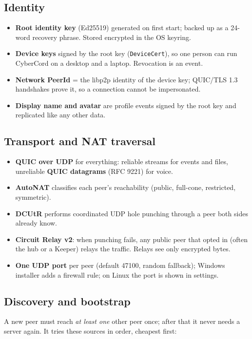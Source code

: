 \documentclass[11pt,a4paper]{article}
\begin{document}
\subsection{Identity}
\begin{itemize}
  \item \textbf{Root identity key} (Ed25519) generated on first start; backed up as a
        24-word recovery phrase. Stored encrypted in the OS keyring.
  \item \textbf{Device keys} signed by the root key (\texttt{DeviceCert}), so one person can
        run CyberCord on a desktop and a laptop. Revocation is an event.
  \item \textbf{Network PeerId} = the libp2p identity of the device key; QUIC/TLS 1.3
        handshakes prove it, so a connection cannot be impersonated.
  \item \textbf{Display name and avatar} are profile events signed by the root key and
        replicated like any other data.
\end{itemize}

\subsection{Transport and NAT traversal}
\begin{itemize}
  \item \textbf{QUIC over UDP} for everything: reliable streams for events and files,
        unreliable \textbf{QUIC datagrams} (RFC 9221) for voice.
  \item \textbf{AutoNAT} classifies each peer's reachability (public, full-cone,
        restricted, symmetric).
  \item \textbf{DCUtR} performs coordinated UDP hole punching through a peer both sides
        already know.
  \item \textbf{Circuit Relay v2}: when punching fails, any public peer that opted in
        (often the hub or a Keeper) relays the traffic. Relays see only encrypted bytes.
  \item \textbf{One UDP port} per peer (default 47100, random fallback); Windows installer
        adds a firewall rule; on Linux the port is shown in settings.
\end{itemize}

\subsection{Discovery and bootstrap}
A new peer must reach \emph{at least one} other peer once; after that it never needs a
server again. It tries these sources in order, cheapest first:
\end{document}
